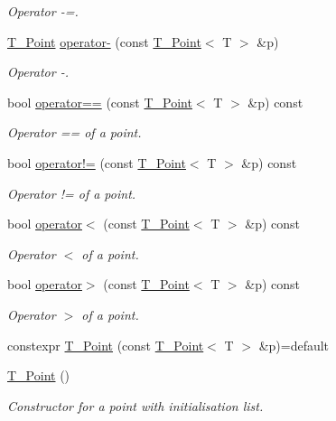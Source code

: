 \begin{DoxyCompactItemize}
\begin{DoxyCompactList}\small\item\em Operator -\/=. \end{DoxyCompactList}\item 
\hyperlink{classT__Point}{T\+\_\+\+Point} \hyperlink{classT__Point_a4a3671d0a9763b3e749c799294ebb1ca}{operator-\/} (const \hyperlink{classT__Point}{T\+\_\+\+Point}$<$ T $>$ \&p)
\begin{DoxyCompactList}\small\item\em Operator -\/. \end{DoxyCompactList}\item 
bool \hyperlink{classT__Point_a83c15f53049523cc75c23350ceb4832a}{operator==} (const \hyperlink{classT__Point}{T\+\_\+\+Point}$<$ T $>$ \&p) const
\begin{DoxyCompactList}\small\item\em Operator == of a point. \end{DoxyCompactList}\item 
bool \hyperlink{classT__Point_ab92f1605c6f5008b42105b4c7a7fc1b2}{operator!=} (const \hyperlink{classT__Point}{T\+\_\+\+Point}$<$ T $>$ \&p) const
\begin{DoxyCompactList}\small\item\em Operator != of a point. \end{DoxyCompactList}\item 
bool \hyperlink{classT__Point_a95cb559fe5888b44481f6ad3aebabefe}{operator$<$} (const \hyperlink{classT__Point}{T\+\_\+\+Point}$<$ T $>$ \&p) const
\begin{DoxyCompactList}\small\item\em Operator $<$ of a point. \end{DoxyCompactList}\item 
bool \hyperlink{classT__Point_a0a9956de8ab7c8dccf35b78c43aedefd}{operator$>$} (const \hyperlink{classT__Point}{T\+\_\+\+Point}$<$ T $>$ \&p) const
\begin{DoxyCompactList}\small\item\em Operator $>$ of a point. \end{DoxyCompactList}\item 
constexpr \hyperlink{classT__Point_af313da04154273b9a75d66e9950359ea}{T\+\_\+\+Point} (const \hyperlink{classT__Point}{T\+\_\+\+Point}$<$ T $>$ \&p)=default
\item 
\hyperlink{classT__Point_a61017b12d3c2aa88a242dbbc57733413}{T\+\_\+\+Point} ()
\begin{DoxyCompactList}\small\item\em Constructor for a point with initialisation list. \end{DoxyCompactList}\item 

\end{DoxyCompactItemize}
